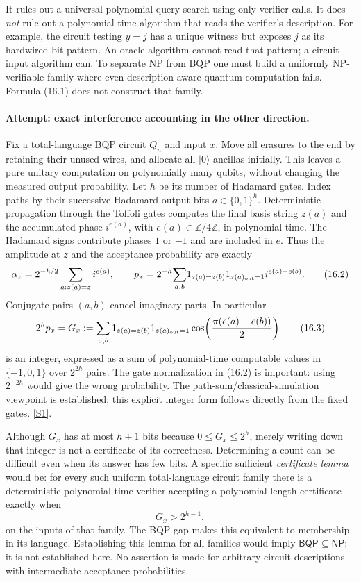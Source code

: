 \documentclass[11pt,a4paper]{article}
\newcommand{\Z}{\mathbb{Z}}
\newcommand{\sref}[2]{\hyperlink{source:#1:#2}{[S#2]}}
\begin{document}
It rules out a universal polynomial-query search using only verifier
calls. It does \emph{not} rule out a polynomial-time algorithm that reads
the verifier's description. For example, the circuit testing $y=j$ has
a unique witness but exposes $j$ as its hardwired bit pattern. An oracle
algorithm cannot read that pattern; a circuit-input algorithm can. To
separate NP from BQP one must build a uniformly NP-verifiable family
where even description-aware quantum computation fails. Formula (16.1)
does not construct that family.

\paragraph{Attempt: exact interference accounting in the other direction.}
Fix a total-language BQP circuit $Q_n$ and input $x$. Move all erasures to
the end by retaining their unused wires, and allocate all $|0\rangle$
ancillas initially. This leaves a pure unitary computation on polynomially
many qubits, without changing the measured output probability. Let $h$
be its number of Hadamard gates. Index paths by their successive Hadamard
output bits $a\in\{0,1\}^h$. Deterministic propagation through the Toffoli
gates computes the final basis string $z(a)$ and the accumulated phase
$i^{e(a)}$, with $e(a)\in\Z/4\Z$, in polynomial time.
The Hadamard signs contribute phases $1$ or $-1$ and are included in $e$.
Thus the amplitude at $z$ and the acceptance probability are exactly
\[
 \alpha_z=2^{-h/2}\sum_{a:z(a)=z}i^{e(a)},\qquad
 p_x=2^{-h}\!\sum_{a,b}\!
 1_{z(a)=z(b)}1_{z(a)_{\rm out}=1}i^{e(a)-e(b)}.
 \tag{16.2}
\]
Conjugate pairs $(a,b)$ cancel imaginary parts. In particular
\[
 2^hp_x=G_x:=\sum_{a,b}
 1_{z(a)=z(b)}1_{z(a)_{\rm out}=1}
 \cos\!\left(\frac{\pi(e(a)-e(b))}{2}\right)
 \tag{16.3}
\]
is an integer, expressed as a sum of polynomial-time computable values
in $\{-1,0,1\}$ over $2^{2h}$ pairs. The gate normalization in (16.2)
is important: using $2^{-2h}$ would give the wrong probability.
The path-sum/classical-simulation viewpoint is established; this explicit
integer form follows directly from the fixed gates. \sref{30006681}{1}.

Although $G_x$ has at most $h+1$ bits because $0\leq G_x\leq2^h$, merely
writing down that integer is not a certificate of its correctness.
Determining a count can be difficult even when its answer has few bits.
A specific sufficient \emph{certificate lemma} would be: for every such
uniform total-language circuit family there is a deterministic
polynomial-time verifier accepting a polynomial-length certificate exactly
when
\[
 G_x>2^{h-1},
 \tag{16.4}
\]
on the inputs of that family. The BQP gap makes this equivalent to
membership in its language. Establishing this lemma for all families
would imply $\mathsf{BQP}\subseteq\mathsf{NP}$; it is not established here.
No assertion is made for arbitrary circuit descriptions with intermediate
acceptance probabilities.
\end{document}
